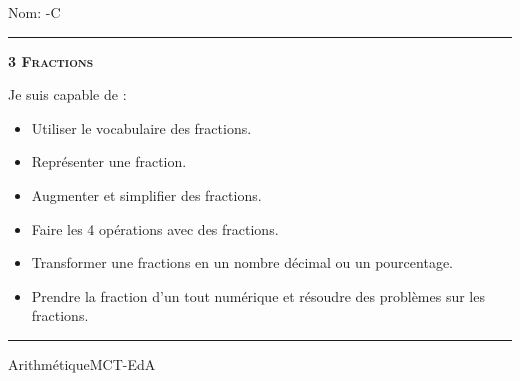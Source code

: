 \documentclass[11pt,a4paper]{article}
\begin{document}
\begin{titlepage}
    \setlength{\topskip}{0mm}
Nom: \hfill \the\year-C
\vspace{0.5cm}
\hrule

    \centering
    \vspace{0.1\textheight}
	{\bfseries\scshape\Huge 3 Fractions\par}
    \vspace{1.5cm}

    {\huge }
	\vspace{1.5cm}
    
    {\large Je suis capable de :}
    \vspace{1.5cm}
    \begin{itemize}
\item Utiliser le vocabulaire des fractions.
\item Représenter une fraction.
\item Augmenter et simplifier des fractions.
\item Faire les 4 opérations avec des fractions.
\item Transformer une  fractions en un  nombre décimal ou un pourcentage.
\item Prendre la fraction d'un tout numérique et résoudre des problèmes sur les fractions.\end{itemize}

\vfill
\hrule
\vspace{0.5cm}
Arithmétique\hfill MCT-EdA

\end{titlepage}
\end{document}
